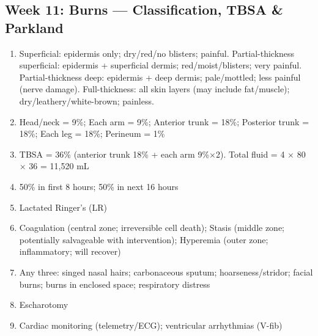 \documentclass[11pt,letterpaper]{article}
\begin{document}
\begin{keybox}
\subsection*{Week 11: Burns --- Classification, TBSA \& Parkland}
\begin{enumerate}[leftmargin=1.5em,label=\textbf{\arabic*.},start=111]
  \item Superficial: epidermis only; dry/red/no blisters; painful.
        Partial-thickness superficial: epidermis + superficial dermis; red/moist/blisters; very painful.
        Partial-thickness deep: epidermis + deep dermis; pale/mottled; less painful (nerve damage).
        Full-thickness: all skin layers (may include fat/muscle); dry/leathery/white-brown; painless.
  \item Head/neck = 9\%; Each arm = 9\%; Anterior trunk = 18\%; Posterior trunk = 18\%;
        Each leg = 18\%; Perineum = 1\%
  \item TBSA = 36\% (anterior trunk 18\% + each arm 9\%$\times$2).
        Total fluid = 4 $\times$ 80 $\times$ 36 = 11{,}520 mL
  \item 50\% in first 8 hours; 50\% in next 16 hours
  \item Lactated Ringer's (LR)
  \item Coagulation (central zone; irreversible cell death);
        Stasis (middle zone; potentially salvageable with intervention);
        Hyperemia (outer zone; inflammatory; will recover)
  \item Any three: singed nasal hairs; carbonaceous sputum; hoarseness/stridor; facial burns;
        burns in enclosed space; respiratory distress
  \item Escharotomy
  \item Cardiac monitoring (telemetry/ECG); ventricular arrhythmias (V-fib)
\end{enumerate}

\hrulefill

\end{keybox}
\end{document}
